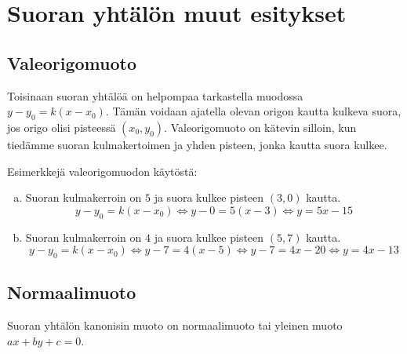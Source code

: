 \section{Suoran yhtälön muut esitykset}


\subsection*{Valeorigomuoto} %

Toisinaan suoran yhtälöä on helpompaa tarkastella muodossa $y-y_0=k(x-x_0)$.
Tämän voidaan ajatella olevan origon kautta kulkeva suora, jos origo olisi
pisteessä $(x_0, y_0)$. Valeorigomuoto on kätevin silloin, kun tiedämme suoran
kulmakertoimen ja yhden pisteen, jonka kautta suora kulkee.

\begin{esimerkki}
    Esimerkkejä valeorigomuodon käytöstä:
    \begin{enumerate}[a)]
        \item Suoran kulmakerroin on $5$ ja suora kulkee pisteen $(3,0)$ kautta.
        \[y-y_0 = k(x-x_0) \Leftrightarrow y-0 = 5(x-3) \Leftrightarrow y = 5x-15\]
        \item Suoran kulmakerroin on $4$ ja suora kulkee pisteen $(5,7)$ kautta.
        \[y-y_0 = k(x-x_0) \Leftrightarrow y-7 = 4(x-5) \Leftrightarrow y-7 = 4x-20 \Leftrightarrow y = 4x-13\]
    \end{enumerate}
\end{esimerkki}

\subsection*{Normaalimuoto}

Suoran yhtälön kanonisin muoto on normaalimuoto tai yleinen muoto $ax+by+c=0$.
